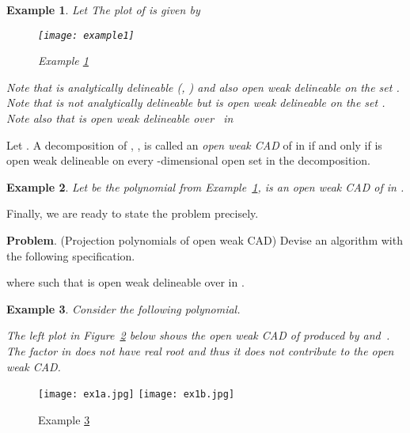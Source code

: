 \documentclass[amsthm]{elsart}
\newtheorem{ex}{Example}   \renewcommand{\algorithmicrequire}{\textsf{Input:}}
\begin{document}
\begin{ex}\label{ex:wod}
Let 
The plot of  is given by
\begin{figure}[ht]
\begin{centering}
        \texttt{[image: example1]}
\caption{Example \ref{ex:wod}\label{fig:ex21} }
\end{centering}
\end{figure}

\noindent
Note that  is analytically delineable (\citet{collins1}, \citet{McCallum2}) and also open weak delineable on the set .
Note that  is {\em not\/} analytically delineable  but {\em is\/} open weak delineable on the set . Note also that  is open weak delineable over~ in 
\end{ex}





\begin{defn}
Let . A decomposition of , , is called an {\em open weak CAD\/} of  in  if and only if  is open weak delineable on every -dimensional open set in the decomposition. \end{defn}

\begin{ex}
Let  be the  polynomial from Example~\ref{ex:wod}, 
is an open weak CAD of  in .
\end{ex}

Finally, we are ready to state the problem precisely.\medskip

\noindent \textbf{Problem}. (Projection polynomials of open weak CAD) Devise an algorithm with the following specification.
\medskip
\begin{description}[leftmargin=3em,style=nextline,itemsep=0.5em]
\item[\sf In:]   
\item[\sf Out:]   where 
such that  is open weak delineable over  in .
\end{description}

\begin{ex}\label{ex:1}
Consider the following polynomial. \medskip
\begin{description}[leftmargin=3em,style=nextline,itemsep=0.5em]
\item[\sf In:]   
\item[\sf Out:]  
\item[]             
\end{description} \medskip
The left plot in Figure~\ref{fig:ex1ab} below shows the open weak CAD of   produced by  and~.
The factor  in  does not have real root and thus it does not contribute to the open weak CAD.
\end{ex}
\begin{figure}[h]
\begin{center}
\texttt{[image: ex1a.jpg]}
\texttt{[image: ex1b.jpg]}
\end{center}
\caption{\label{fig:ex1ab}Example \ref{ex:1} }
\end{figure}
\end{document}
